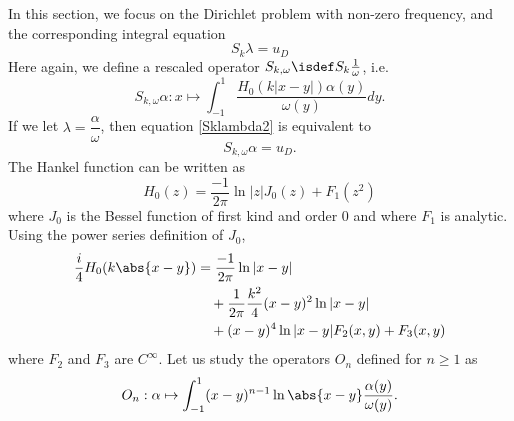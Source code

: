 \documentclass[a4paper]{article}
\begin{document}
In this section, we focus on the Dirichlet problem with non-zero frequency, and the corresponding integral equation 
\begin{equation}
S_k \lambda = u_D
\label{Sklambda2}
\end{equation}
Here again, we define a rescaled operator $S_{k,\omega} \isdef S_k \frac{1}{\omega}$, i.e.
\[S_{k,\omega}\alpha : x \mapsto \int_{-1}^1 \dfrac{H_0(k|x-y|) \alpha(y)}{\omega(y)}dy.\]
If we let $\lambda = \dfrac{\alpha}{\omega}$, then equation \eqref{Sklambda2} is equivalent to
\[S_{k,\omega}\alpha = u_D.\]
The Hankel function can be written as 
\[H_0(z) = \frac{-1}{2\pi}\ln|z| J_0(z) + F_1(z^2)\]
where $J_0$ is the Bessel function of first kind and order $0$ and where $F_1$ is analytic. Using the power series definition of $J_0$, 
\begin{align}
	\begin{split}
		\frac{i}{4}H_0(k \abs{x - y}) &= \frac{-1}{2\pi}\ln |x-y| \label{decompHankel}\\ 
		&\quad + \frac{1}{2\pi} \frac{k^2}{4} (x- y)^2 \ln |x-y|\\
		&\quad + (x-y)^4 \ln|x-y|F_2(x,y) + F_3(x,y)
	\end{split}
\end{align}
\noindent where $F_2$ and $F_3$ are $C^{\infty}$. Let us study the operators $O_n$ defined for $n \geq 1$ as 
\[O_n : \alpha \mapsto \int_{-1}^{1}(x-y)^{n-1} \ln\abs{x - y} \frac{\alpha(y)}{\omega(y)}.\]
\end{document}

